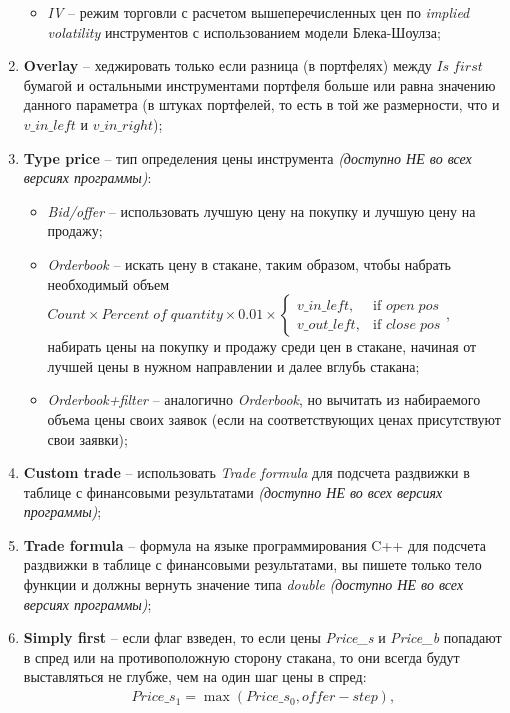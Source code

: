 \begin{enumerate}
\begin{itemize}
		\item \textit{IV} -- режим торговли с расчетом вышеперечисленных цен по \textit{implied volatility} инструментов с использованием модели Блека-Шоулза;
		\end{itemize}
	\item \textbf{Overlay} -- хеджировать только если разница (в портфелях) между $Is \; first$ бумагой и остальными инструментами портфеля больше или равна значению данного
		параметра (в штуках портфелей, то есть в той же размерности, что и $v\_in\_left$ и $v\_in\_right$);
	\item \textbf{Type price} -- тип определения цены инструмента \textit{(доступно НЕ во всех версиях программы)}:
		\begin{itemize}
		\item \textit{Bid/offer} -- использовать лучшую цену на покупку и лучшую цену на продажу;
		\item \textit{Orderbook} -- искать цену в стакане, таким образом, чтобы набрать необходимый объем $Count \times Percent \; of \; quantity \times 0.01 \times \begin{cases} v\_in\_left, & \mbox{if } open \; pos \\ v\_out\_left, & \mbox{if } close \; pos \end{cases}$,
			набирать цены на покупку и продажу среди цен в стакане, начиная от лучшей цены в нужном направлении и далее вглубь стакана;
		\item \textit{Orderbook+filter} -- аналогично \textit{Orderbook}, но вычитать из набираемого объема цены своих заявок (если на соответствующих
			ценах присутствуют свои заявки);
		\end{itemize}
	\item \textbf{Custom trade} -- использовать \textit{Trade formula} для подсчета раздвижки в таблице с финансовыми результатами \textit{(доступно НЕ во всех версиях программы)};
	\item \textbf{Trade formula} -- формула на языке программирования C++ для подсчета раздвижки в таблице с финансовыми результатами, вы пишете только тело функции
			и должны вернуть значение типа \textit{double} \textit{(доступно НЕ во всех версиях программы)};
	\item \textbf{Simply first} -- если флаг взведен, то если цены \textit{Price\_s} и \textit{Price\_b} попадают в спред или на противоположную сторону стакана, то они всегда будут выставляться не глубже, чем на один шаг цены в спред:
		\begin{align*}
			Price\_s_1 = \max(Price\_s_0, offer - step), \\

\end{align*}
\end{enumerate}
